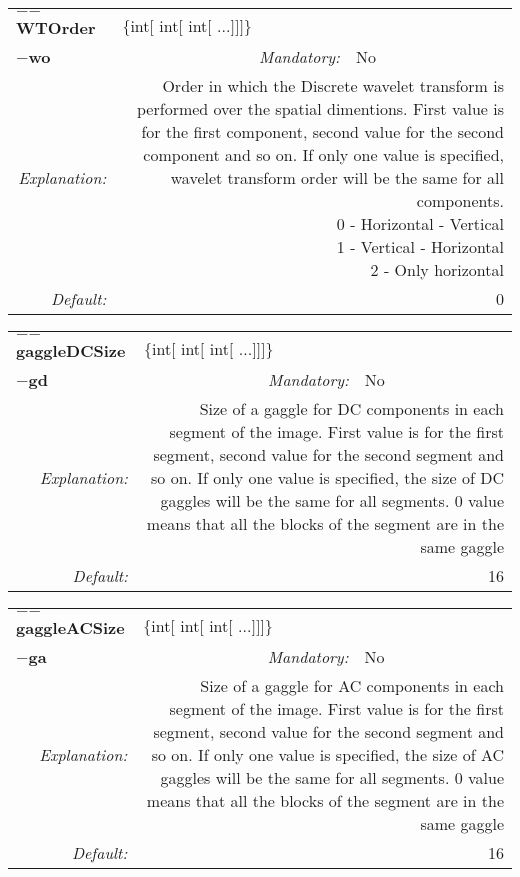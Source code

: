 \begin{center}\begin{tabular}{|rr|rlrl|}
\hline
\multicolumn{2}{|l|}{\textbf{$-$$-$WTOrder}} & \multicolumn{4}{|l|}{$\{$int$[$ int$[$ int$[$ ...$]$$]$$]$$\}$} \\
\cline{3-6}
\multicolumn{2}{|l|}{\textbf{$-$wo}} & \emph{Mandatory:} & No & &  \\
\hline
\emph{Explanation:} & \multicolumn{5}{|p{12cm}|}{Order in which the Discrete wavelet transform is performed over the spatial dimentions. First value is for the first component, second value for the second component and so on. If only one value is specified, wavelet transform order will be the same for all components. \newline 0 - Horizontal - Vertical \newline 1 - Vertical - Horizontal \newline 2 - Only horizontal} \\
\hline
\emph{Default:} & \multicolumn{5}{|p{12cm}|}{0 } \\
\hline
\end{tabular}\end{center}
\begin{center}\begin{tabular}{|rr|rlrl|}
\hline
\multicolumn{2}{|l|}{\textbf{$-$$-$gaggleDCSize}} & \multicolumn{4}{|l|}{$\{$int$[$ int$[$ int$[$ ...$]$$]$$]$$\}$} \\
\cline{3-6}
\multicolumn{2}{|l|}{\textbf{$-$gd}} & \emph{Mandatory:} & No & &  \\
\hline
\emph{Explanation:} & \multicolumn{5}{|p{12cm}|}{Size of a gaggle for DC components in each segment of the image. First value is for the first segment, second value for the second segment and so on. If only one value is specified, the size of DC gaggles will be the same for all segments. 0 value means that all the blocks of the segment are in the same gaggle} \\
\hline
\emph{Default:} & \multicolumn{5}{|p{12cm}|}{16 } \\
\hline
\end{tabular}\end{center}
\begin{center}\begin{tabular}{|rr|rlrl|}
\hline
\multicolumn{2}{|l|}{\textbf{$-$$-$gaggleACSize}} & \multicolumn{4}{|l|}{$\{$int$[$ int$[$ int$[$ ...$]$$]$$]$$\}$} \\
\cline{3-6}
\multicolumn{2}{|l|}{\textbf{$-$ga}} & \emph{Mandatory:} & No & &  \\
\hline
\emph{Explanation:} & \multicolumn{5}{|p{12cm}|}{Size of a gaggle for AC components in each segment of the image. First value is for the first segment, second value for the second segment and so on. If only one value is specified, the size of AC gaggles will be the same for all segments. 0 value means that all the blocks of the segment are in the same gaggle} \\
\hline
\emph{Default:} & \multicolumn{5}{|p{12cm}|}{16 } \\
\hline
\end{tabular}\end{center}
